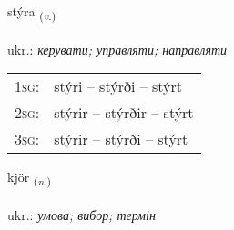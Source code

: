 \documentclass[frontgrid, backgrid]{flacards}\usepackage[]{graphicx}\usepackage[]{xcolor}
\begin{document}
\renewcommand{\flhead}{\vskip5pt \fboxsep=0pt {\small\bfseries\footnotesize Sagnorð | дієслово}}
\renewcommand{\fcfoot}{\vskip5pt \fboxsep=0pt \hspace{2pt}{\small\bfseries\footnotesize 2K}}

\renewcommand{\blhead}{\vskip5pt {\small\bfseries\footnotesize Sagnorð | дієслово }}
\renewcommand{\bcfoot}{\vskip5pt \hspace{2pt}{\small\bfseries\footnotesize 2K}}


{stýra \small{\textsubscript{(\textit{v.})}} \\[1ex] %
\textphonetic{[stiːra]} \\
ukr.: \emph{керувати; управляти; направляти} \\  [2ex]
\renewcommand*{\arraystretch}{0.8}
\begin{tabular}{p{1cm}l}
\textsc{1sg}: & stýri -- stýrði -- stýrt \\ 
\textsc{2sg}: & stýrir -- stýrðir -- stýrt \\ 
\textsc{3sg}: & stýrir -- stýrði -- stýrt \\ 
\end{tabular}
}

\renewcommand{\flhead}{\vskip5pt \fboxsep=0pt {\small\bfseries\footnotesize Nafnorð | іменник}}
\renewcommand{\fcfoot}{\vskip5pt \fboxsep=0pt \hspace{2pt}{\small\bfseries\footnotesize 2K}}

\renewcommand{\blhead}{\vskip5pt {\small\bfseries\footnotesize Nafnorð | іменник }}
\renewcommand{\bcfoot}{\vskip5pt \hspace{2pt}{\small\bfseries\footnotesize 2K}}


{kjör \small{\textsubscript{(\textit{n.})}} \\[1ex] %
\textphonetic{[cʰœːr]} \\
ukr.: \emph{умова; вибор; термін} \\  [2ex]
\renewcommand*{\arraystretch}{0.8}
}
\end{document}
